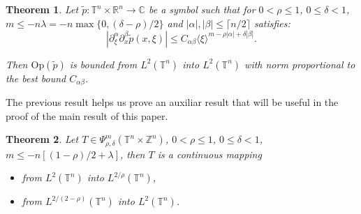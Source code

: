 \documentclass[12pt, reqno]{amsart}
\newtheorem{theorem}{Theorem}[section]
\theoremstyle{definition}
\theoremstyle{remark}
\numberwithin{equation}{section}
\begin{document}
\begin{theorem}
    Let $\tilde{p}:\mathbb{T}^n \times \mathbb{R}^n \rightarrow \mathbb{C}$ be a symbol such that for $0<\rho\leq1$, $0\leq \delta < 1$, $m\leq -n \lambda = -n\max\{0, (\delta - \rho)/2\}$ and $|\alpha|,|\beta| \leq \lceil n/2\rceil$ satisfies: 
    \begin{equation}
        \left|\partial^\alpha_\xi \partial^\beta_x \tilde{p}(x, \xi)\right| \leq C_{\alpha\beta}\langle\xi\rangle^{m-\rho|\alpha| + \delta|\beta|}.
    \end{equation}

    Then $\mathrm{Op}(\tilde{p})$ is bounded from $L^2(\mathbb{T}^n)$ into $L^2(\mathbb{T}^n)$ with norm proportional to the best bound $C_{\alpha\beta}$.
    \label{theo:22boundT}
\end{theorem}
The previous result helps us prove an auxiliar result that will be useful in the proof of the main result of this paper.
\begin{theorem}
    Let $T \in \Psi^m_{\rho, \delta}(\mathbb{T}^n \times \mathbb{Z}^n) $, $0 < \rho \leq 1$, $0 \leq \delta < 1$, $m \leq - n [(1-\rho)/2 + \lambda] $, then $T$ is a continuous mapping
    \begin{itemize}
        \item[(a)]  from $L^2(\mathbb{T}^n)$ into $L^{2/\rho}(\mathbb{T}^n)$,\\
        \item[(b)] from $L^{2/(2-\rho)}(\mathbb{T}^n)$ into $L^{2}(\mathbb{T}^n)$.
    \end{itemize}
    \label{theo:Lbounds}
\end{theorem}
\end{document}
